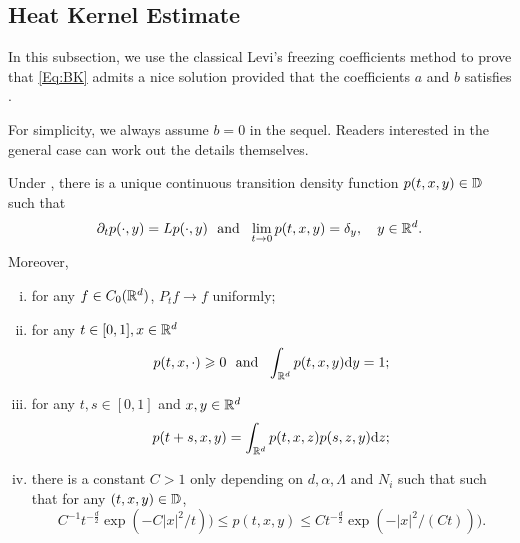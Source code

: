 \subsection{Heat Kernel Estimate}
In this subsection, we use the classical Levi's freezing coefficients method to prove that \eqref{Eq:BK} admits a nice solution provided that the coefficients \(a\) and \(b\) satisfies . 


For simplicity, we always assume \(b=0\) in the sequel. Readers interested in the general case can work out the details themselves.

\begin{theorem}\label{Thm:HKE1}
    Under , there is a unique continuous transition density function \(p(t,x,y)\in {\mathbb D}\) such that 
    \[
    \partial_tp(\cdot,y)=Lp(\cdot,y)~\mbox{ and }~ \lim_{t\to0}p(t,x,y)=\delta_y, \quad y\in {\mathbb R}^d.  
    \]
    Moreover, 
    \begin{enumerate}[(i)]
        \item 
        for any \(f\in C_0({\mathbb R}^d)\), \(P_t f\to f\) uniformly; 
        \item for any \(t\in [0,1], x\in {\mathbb R}^d\)
        \begin{equation}
            p(t,x,\cdot)\geqslant 0 ~ \mbox{ and }~\int_{{\mathbb R}^d} p(t,x,y) \text{\rm{d}} y=1; 
        \end{equation}
        \item for any \(t,s\in [0,1]\) and \(x,y\in {\mathbb R}^d\)
        \begin{equation}
             p(t+s,x,y)= \int_{{\mathbb R}^d} p(t,x,z)p(s,z,y) \text{\rm{d}} z; 
        \end{equation}
        \item there is a constant \(C>1\) only depending on \(d,\alpha,\Lambda\) and \(N_i\) such that such that for any \((t,x,y)\in {\mathbb D}\), 
        \begin{equation}\label{Eq:HEK1}
            C^{-1} t^{-\frac{d}{2}} \exp(-{C|x|^2}/t)) \leq p(t,x,y)\leq C t^{-\frac{d}{2}} \exp(-{|x|^2}/(Ct))). 
        \end{equation}
    \end{enumerate}
\end{theorem}


